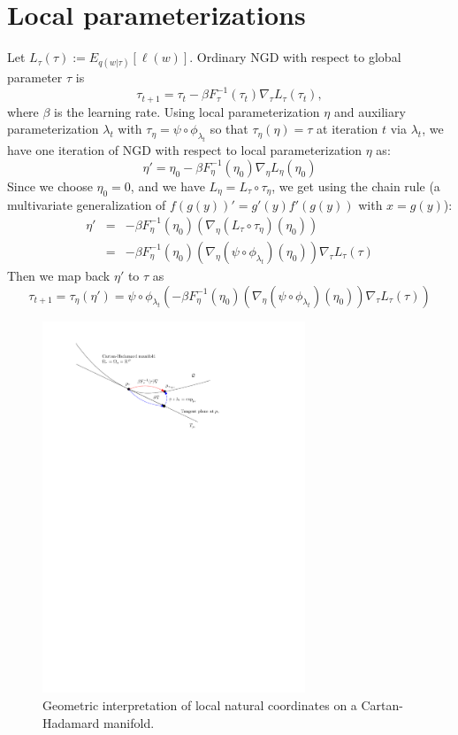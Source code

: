 \documentclass{article}
\begin{document}
\section*{Local parameterizations}

Let $L_\tau(\tau):=E_{q(w|\tau)}[\ell(w)]$.
Ordinary NGD with respect to global parameter $\tau$ is
$$
\tau_{t+1} = \tau_t-\beta F_\tau^{-1}(\tau_t) \nabla_\tau L_\tau(\tau_t),
$$
where $\beta$ is the learning rate.
Using local parameterization $\eta$ and auxiliary parameterization $\lambda_t$ 
with $\tau_\eta=\psi\circ\phi_{\lambda_t}$ so that $\tau_\eta(\eta)=\tau$ at iteration $t$ via $\lambda_t$, 
we have one iteration of NGD with respect to local parameterization $\eta$ as:
$$
\eta'=\eta_0-\beta F_\eta^{-1}(\eta_0) \nabla_\eta L_\eta(\eta_0)
$$
Since we choose $\eta_0=0$, and we have $L_\eta=L_\tau \circ \tau_\eta$, we get using the chain rule (a multivariate generalization of  $f(g(y))'=g'(y)f'(g(y))$ with $x=g(y)$):
\begin{eqnarray*}
\eta' &=& -\beta F_\eta^{-1}(\eta_0)   \left(\nabla_\eta (L_\tau \circ \tau_\eta)(\eta_0)\right) \\
&=& -\beta F_\eta^{-1}(\eta_0)  \left(\nabla_\eta (\psi\circ\phi_{\lambda_t})(\eta_0)\right) \nabla_\tau L_\tau(\tau)
\end{eqnarray*}
Then we map back $\eta'$ to $\tau$ as 
$$
\tau_{t+1}=\tau_\eta(\eta')=\psi\circ\phi_{\lambda_t}\left(
-\beta F_\eta^{-1}(\eta_0)  (\nabla_\eta (\psi\circ\phi_{\lambda_t})(\eta_0)) \nabla_\tau L_\tau(\tau)
\right)
$$

\begin{figure}
\centering
\includegraphics[width=0.7\textwidth]{FigIpe-LocalNaturalCoordinatesCartanHadamardMfd.pdf}
\caption{Geometric interpretation of local natural coordinates on a Cartan-Hadamard manifold.}\label{fig:geointerpretation}
\end{figure}
\end{document}
